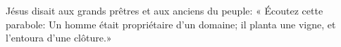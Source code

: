\encetemps
	Jésus disait aux grands prêtres et aux anciens du peuple:
    « Écoutez cette parabole:
	Un homme était propriétaire d’un domaine;
	il planta une vigne, et l’entoura d’une clôture.»
